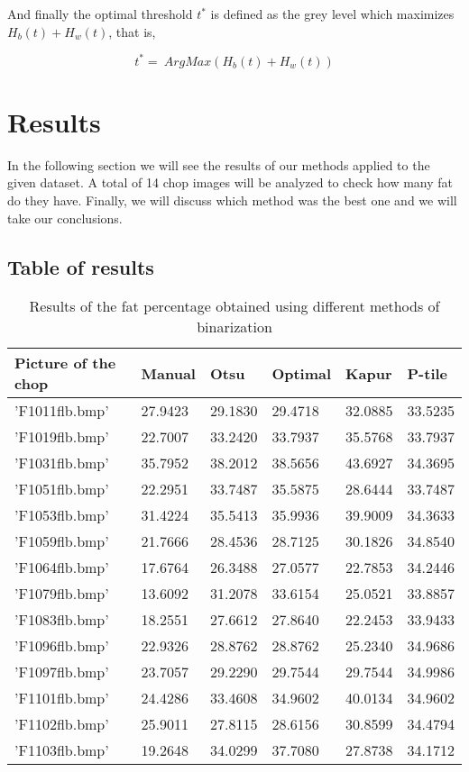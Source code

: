 \documentclass[12]{article}
\begin{document}
And finally the optimal threshold $t^{*}$ is defined as the grey level which maximizes $H_b(t)+H_w(t)$, that is, 
\vspace{-0.5cm}
\begin{center}
$$t^{*}=\ ArgMax\left(H_b(t) + H_w(t)\right)$$
\end{center}
\section{Results}
In the following section we will see the results of our methods applied to the given dataset. A total of 14 chop images will be analyzed to check how many fat do they have.  
Finally, we will discuss which method was the best one and we will take our conclusions. %
\subsection{Table of results}

\begin{table}[H]
\centering
\begin{tabular}{|l|l|l|l|l|l|}
\hline	Picture of the chop & \textbf{Manual} & \textbf{Otsu} & \textbf{Optimal} & \textbf{Kapur} & \textbf{P-tile} \\  \hline
'F1011flb.bmp' & 27.9423	& 29.1830	& 29.4718	& 32.0885	& 33.5235 \\ \hline
'F1019flb.bmp' & 22.7007	& 33.2420	& 33.7937	& 35.5768	& 33.7937 \\ \hline
'F1031flb.bmp' & 35.7952	& 38.2012	& 38.5656	& 43.6927	& 34.3695 \\ \hline
'F1051flb.bmp' & 22.2951	& 33.7487	& 35.5875	& 28.6444	& 33.7487 \\ \hline
'F1053flb.bmp' & 31.4224	& 35.5413	& 35.9936	& 39.9009	& 34.3633 \\ \hline
'F1059flb.bmp' & 21.7666	& 28.4536	& 28.7125	& 30.1826	& 34.8540 \\ \hline
'F1064flb.bmp' & 17.6764	& 26.3488	& 27.0577	& 22.7853	& 34.2446 \\ \hline
'F1079flb.bmp' & 13.6092	& 31.2078	& 33.6154	& 25.0521	& 33.8857 \\ \hline
'F1083flb.bmp' & 18.2551	& 27.6612	& 27.8640	& 22.2453	& 33.9433 \\ \hline
'F1096flb.bmp' & 22.9326	& 28.8762	& 28.8762	& 25.2340	& 34.9686 \\ \hline
'F1097flb.bmp' & 23.7057	& 29.2290	& 29.7544	& 29.7544	& 34.9986 \\ \hline
'F1101flb.bmp' & 24.4286	& 33.4608	& 34.9602	& 40.0134	& 34.9602 \\ \hline
'F1102flb.bmp' & 25.9011	& 27.8115	& 28.6156	& 30.8599	& 34.4794 \\ \hline
'F1103flb.bmp' & 19.2648	& 34.0299	& 37.7080	& 27.8738	& 34.1712 \\ \hline
\end{tabular}
\caption{Results of the fat percentage obtained using different methods of binarization}
\label{Results}
\end{table}
\end{document}
